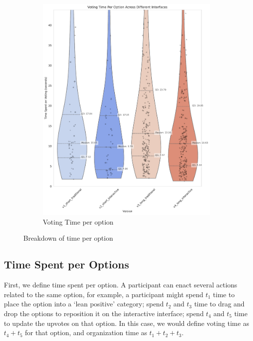 \begin{figure}[h]
\begin{subfigure}[b]{0.32\textwidth}
        \includegraphics[width=\textwidth]{content/image/results/voting_time_per_option.pdf}
        \caption{Voting Time per option}
        \label{fig:vote_time}
    \end{subfigure}
    \caption{Breakdown of time per option}
    \label{fig:Time Spent Per Option Per Person}
\end{figure}

\subsection{Time Spent per Options}
First, we define time spent per option. A participant can enact several actions related to the same option, for example, a participant might spend $t_1$ time to place the option into a `lean positive' category; spend $t_2$ and $t_3$ time to drag and drop the options to reposition it on the interactive interface; spend $t_4$ and $t_5$ time to update the upvotes on that option. In this case, we would define voting time as $t_4 + t_5$ for that option, and organization time as $t_1 + t_2 + t_3$.

